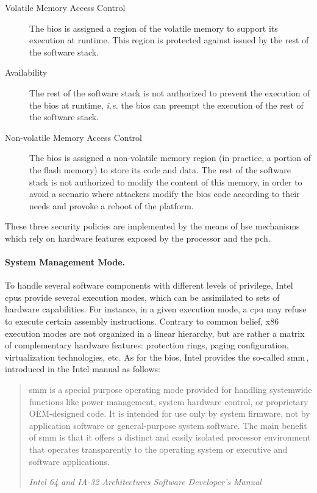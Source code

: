 \begin{description}
\item [Volatile Memory Access Control]
  The \ac{bios} is assigned a region of the volatile memory to support its
  execution at runtime. This region is protected against \IOs issued by the rest
  of the software stack.
\item [Availability]
  The rest of the software stack is not authorized to prevent the execution of
  the \ac{bios} at runtime, \emph{i.e.} the \ac{bios} can preempt the execution
  of the rest of the software stack.
\item [Non-volatile Memory Access Control]
  The \ac{bios} is assigned a non-volatile memory region (in practice, a portion
  of the flash memory) to store its code and data.
  The rest of the software stack is not authorized to modify the content of this
  memory, in order to avoid a scenario where attackers modify the \ac{bios} code
  according to their needs and provoke a reboot of the platform.
\end{description}

These three security policies are implemented by the means of \ac{hse}
mechanisms which rely on hardware features exposed by the processor and the
\ac{pch}.
%

\paragraph{System Management Mode.}
%
To handle several software components with different levels of privilege, Intel
\acp{cpu} provide several execution modes, which can be assimilated to sets of
hardware capabilities.
%
For instance, in a given execution mode, a \ac{cpu} may refuse to execute
certain assembly instructions.
%
Contrary to common belief, x86 execution modes are not organized in a linear
hierarchy, but are rather a matrix of complementary hardware features:
protection rings, paging configuration, virtualization technologies, etc.
%
As for the \ac{bios}, Intel provides the so-called \ac{smm}\,\cite[Volume 3,
Chapter 34]{intel2014manual}, introduced in the Intel manual as follows:


\begin{quote}
  \ac{smm} is a special purpose operating mode provided for handling systemwide
  functions like power management, system hardware control, or proprietary
  OEM-designed code.
  It is intended for use only by system firmware, not by application software or
  general-purpose system software.
  The main benefit of \ac{smm} is that it offers a distinct and easily isolated
  processor environment that operates transparently to the operating system or
  executive and software applications.

  \hfill \small \emph{Intel 64 and IA-32 Architectures Software Developer’s
    Manual}
\end{quote}


